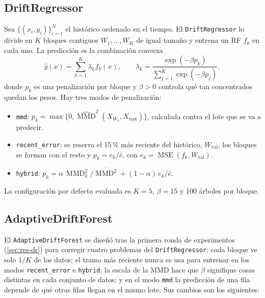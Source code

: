 \documentclass[11pt,a4paper]{article}
\newcommand{\MMD}{\operatorname{MMD}}
\newcommand{\MSE}{\operatorname{MSE}}
\begin{document}
\subsection{DriftRegressor}\label{sec:dr}

Sea $\{(x_i,y_i)\}_{i=1}^{N}$ el histórico ordenado en el tiempo. El \texttt{DriftRegressor} lo
divide en $K$ bloques contiguos $W_1,\dots,W_K$ de igual tamaño y entrena un RF $f_k$ en cada uno. La
predicción es la combinación convexa
\begin{equation}\label{eq:softmax}
\hat y(x) = \sum_{k=1}^{K}\lambda_k f_k(x),\qquad
\lambda_k = \frac{\exp(-\beta p_k)}{\sum_{j=1}^{K}\exp(-\beta p_j)},
\end{equation}
donde $p_k$ es una penalización por bloque y $\beta>0$ controla qué tan concentrados quedan los pesos.
Hay tres modos de penalización:
\begin{itemize}
  \item \texttt{mmd}: $p_k=\max\{0,\widehat{\MMD}^2(X_{W_k},X_{\text{test}})\}$, calculada contra el
  lote que se va a predecir.
  \item \texttt{recent\_error}: se reserva el 15\,\% más reciente del histórico, $W_{\text{val}}$, los
  bloques se forman con el resto y $p_k = e_k/\bar e$, con $e_k=\MSE(f_k,W_{\text{val}})$.
  \item \texttt{hybrid}: $p_k = \alpha\,\MMD^2_k/\overline{\MMD^2} + (1-\alpha)\,e_k/\bar e$.
\end{itemize}
La configuración por defecto evaluada es $K=5$, $\beta=15$ y 100 árboles por bloque.

\subsection{AdaptiveDriftForest}\label{sec:adf}

El \texttt{AdaptiveDriftForest} se diseñó tras la primera ronda de experimentos (\cref{sec:res-dr})
para corregir cuatro problemas del \texttt{DriftRegressor}: cada bloque ve solo $1/K$ de los datos;
el tramo más reciente nunca se usa para entrenar en los modos \texttt{recent\_error} e
\texttt{hybrid}; la escala de la MMD hace que $\beta$ signifique cosas distintas en cada conjunto de
datos; y en el modo \texttt{mmd} la predicción de una fila depende de qué otras filas llegan en el
mismo lote. Sus cambios son los siguientes:
\end{document}
